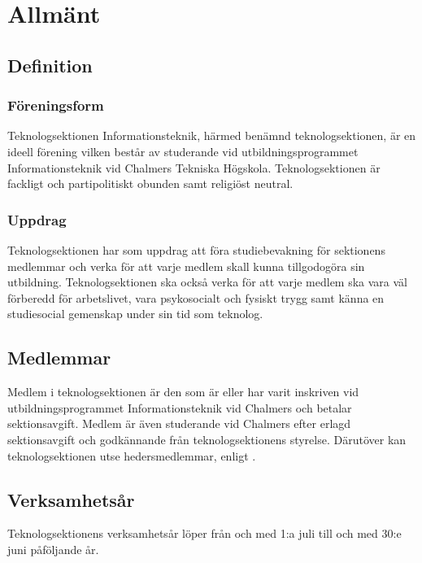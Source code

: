 \section{Allmänt}

\subsection{Definition}

\subsubsection{Föreningsform}
Teknologsektionen Informationsteknik, härmed benämnd teknologsektionen, är en ideell förening vilken består av studerande vid utbildningsprogrammet Informationsteknik vid Chalmers Tekniska Högskola. Teknologsektionen är fackligt och partipolitiskt obunden samt religiöst neutral.

\subsubsection{Uppdrag}
Teknologsektionen har som uppdrag att föra studiebevakning för
sektionens medlemmar och verka för att varje medlem skall kunna tillgodogöra
sin utbildning. Teknologsektionen ska också verka för att varje medlem ska vara
väl förberedd för arbetslivet, vara psykosocialt och fysiskt trygg samt känna en
studiesocial gemenskap under sin tid som teknolog.

\subsection{Medlemmar}

Medlem i teknologsektionen är den som är eller har varit inskriven vid utbildningsprogrammet Informationsteknik vid Chalmers och betalar sektionsavgift. Medlem är även studerande vid Chalmers efter erlagd sektionsavgift och godkännande från teknologsektionens styrelse. Därutöver kan teknologsektionen utse hedersmedlemmar, enligt .

\subsection{Verksamhetsår}
Teknologsektionens verksamhetsår löper från och med 1:a juli till och med 30:e juni påföljande år.
